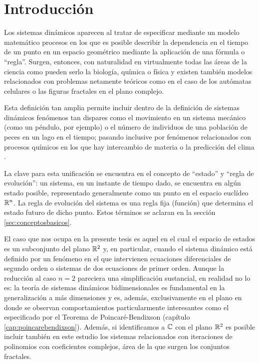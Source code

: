 \chapter{Introducción}
\label{cap:introduccion}

Los sistemas dinámicos aparecen al tratar de especificar mediante un modelo matemático procesos en los que es posible describir la dependencia en el tiempo de un punto en un espacio geométrico mediante la aplicación de una fórmula o ``regla''. Surgen, entonces, con naturalidad en virtualmente todas las áreas de la ciencia como pueden serlo la biología, química o física y existen también modelos relacionados con problemas netamente teóricos como en el caso de los autómatas celulares \cite{schiffautomata} o las figuras fractales en el plano complejo.

Esta definición tan amplia permite incluir dentro de la definición de sistemas dinámicos fenómenos tan dispares como el movimiento en un sistema mecánico (como un péndulo, por ejemplo) o el número de individuos de una población de peces en un lago en el tiempo; pasando inclusive por fenómenos relacionados con procesos químicos en los que hay intercambio de materia o la predicción del clima \cite{lorenz64}.

La clave para esta unificación se encuentra en el concepto de ``estado'' y ``regla de evolución'': un sistema, en un instante de tiempo dado, se encuentra en algún estado posible, representado generalmente como un punto en el espacio euclídeo ${\mathbb{R}}^n$. La regla de evolución del sistema es una regla fija (función) que determina el estado futuro de dicho punto. Estos términos se aclaran en la sección \ref{sec:conceptosbasicos}.

El caso que nos ocupa en la presente tesis es aquel en el cual el espacio de estados es un subconjunto del plano ${\mathbb{R}}^2$ y, en particular, cuando el sistema dinámico está definido por un fenómeno en el que intervienen ecuaciones diferenciales de segundo orden o sistemas de dos ecuaciones de primer orden. Aunque la reducción al caso $n = 2$ pareciera una simplificación sustancial, en realidad no lo es: la teoría de sistemas dinámicos bidimensionales es fundamental en la generalización a más dimensiones y es, además, exclusivamente en el plano en donde se observan comportamientos particularmente interesantes como el especificado por el Teorema de Poincaré-Bendixson (capítulo \ref{cap:poincarebendixson}). Además, si identificamos a ${\mathbb{C}}$ con el plano ${\mathbb{R}}^2$ es posible incluir también en este estudio los sistemas relacionados con iteraciones de polinomios con coeficientes complejos, área de la que surgen los conjuntos fractales.

